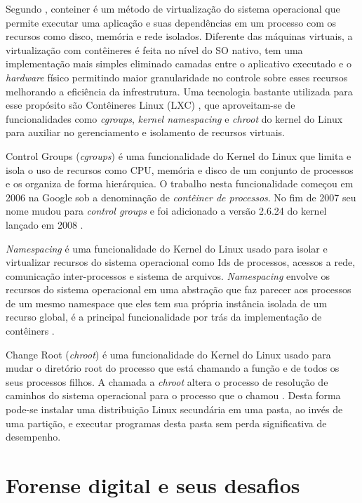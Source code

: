 Segundo \cite{AmazonContainer}, conteiner é um método de virtualização do sistema operacional que permite executar uma aplicação e suas dependências em um processo com os recursos como disco, memória e rede isolados.
%
Diferente das máquinas virtuais, a virtualização com contêineres é feita no nível do SO nativo, tem uma implementação mais simples eliminado camadas entre o aplicativo executado e o \textit{hardware} físico permitindo maior granularidade no controle sobre esses recursos melhorando a eficiência da infrestrutura.
%
Uma tecnologia bastante utilizada para esse propósito são Contêineres Linux (LXC) \cite{Linuxcontainers.org2015}, que aproveitam-se de funcionalidades como \textit{cgroups}, \textit{kernel namespacing} e \textit{chroot} do kernel do Linux para auxiliar no gerenciamento e isolamento de recursos virtuais.

Control Groups (\textit{cgroups}) é uma funcionalidade do Kernel do Linux que limita e isola o uso de recursos como CPU, memória e disco de um conjunto de processos e os organiza de forma hierárquica. 
%
O trabalho nesta funcionalidade começou em 2006 na Google sob a denominação de \textit{contêiner de processos}. No fim de 2007 seu nome mudou para \textit{control groups} e foi adicionado a versão 2.6.24 do kernel lançado em 2008 \cite{UnixManPagesControlGroups}.

\textit{Namespacing} é uma funcionalidade do Kernel do Linux usado para isolar e virtualizar recursos do sistema operacional como Ids de processos, acessos a rede, comunicação inter-processos e sistema de arquivos.
%
\textit{Namespacing} envolve os recursos do sistema operacional em uma abstração que faz parecer aos processos de um mesmo namespace que eles tem sua própria instância isolada de um recurso global, é a principal funcionalidade por trás da implementação de contêiners \cite{UnixManPagesNamespacing}.

Change Root (\textit{chroot}) é uma funcionalidade do Kernel do Linux usado para mudar o diretório root do processo que está chamando a função e de todos os seus processos filhos. 
%
A chamada a \textit{chroot} altera o processo de resolução de caminhos do sistema operacional para o processo que o chamou \cite{UnixManPagesChRoot}.
%
Desta forma pode-se instalar uma distribuição Linux secundária em uma pasta, ao invés de uma partição, e executar programas desta pasta sem perda significativa de desempenho.

\section{Forense digital e seus desafios}
\label{sec:forensedigital}

